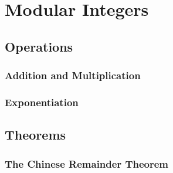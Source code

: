 \section{Modular Integers}




\subsection{Operations}

\subsubsection{Addition and Multiplication}

\subsubsection{Exponentiation}


\subsection{Theorems}


\subsubsection{The Chinese Remainder Theorem}



